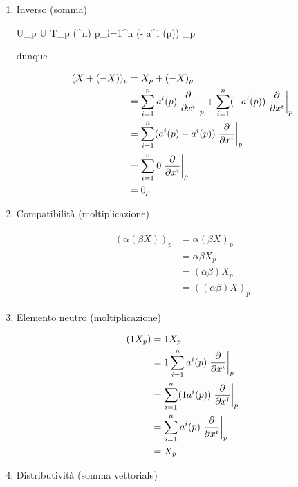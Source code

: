 \begin{enumerate}
	\item Inverso (somma)
	
		{U}{\bigsqcup_{p \in U} T_{p} (\R^{n})}
		{p}{\sum_{i=1}^{n} (- a^{i} (p)) _{p}}
	
	dunque
	
	\begin{align}
		\begin{split}
			(X + (- X))_{p} &= X_{p} + (- X)_{p}\\
			&= \sum_{i=1}^{n} a^{i} (p) \eval{ \pdv{x^{i}} }_{p} + \sum_{i=1}^{n} (- a^{i} (p)) \eval{ \pdv{x^{i}} }_{p}\\
			&= \sum_{i=1}^{n} (a^{i} (p) - a^{i} (p)) \eval{ \pdv{x^{i}} }_{p}\\
			&= \sum_{i=1}^{n} 0 \eval{ \pdv{x^{i}} }_{p}\\
			&= 0_{p}
		\end{split}
	\end{align}
	
	\item Compatibilità (moltiplicazione)
	
	\begin{align}
		\begin{split}
			(\alpha (\beta X))_{p} &= \alpha (\beta X)_{p}\\
			&= \alpha \beta X_{p}\\
			&= (\alpha \beta) X_{p}\\
			&= ((\alpha \beta) X)_{p}
		\end{split}
	\end{align}
	
	\item Elemento neutro (moltiplicazione)
	
	\begin{align}
		\begin{split}
			(1 X_{p}) &= 1 X_{p}\\
			&= 1 \sum_{i=1}^{n} a^{i} (p) \eval{ \pdv{x^{i}} }_{p}\\
			&= \sum_{i=1}^{n} (1 a^{i} (p)) \eval{ \pdv{x^{i}} }_{p}\\
			&= \sum_{i=1}^{n} a^{i} (p) \eval{ \pdv{x^{i}} }_{p}\\
			&= X_{p}
		\end{split}
	\end{align}
	
	\item Distributività (somma vettoriale)
	

\end{enumerate}
